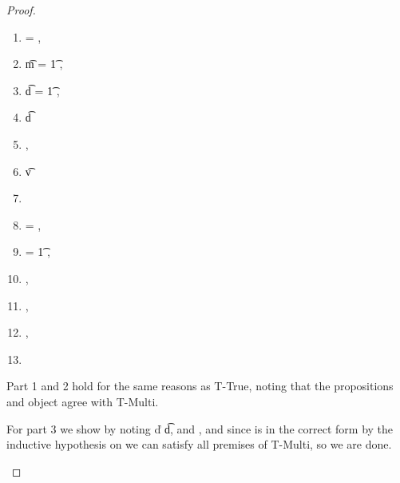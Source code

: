 \begin{lemma}
\begin{proof}
\begin{case}[B-DefMethod]
\begin{itemize}
\begin{subcase}[T-DefMethod]
\begin{enumerate}[resume]
          \item
  \ep{} = { {} {}},
          \item
  \t{m} = {\ArrowOne {\x{}} {\t{1}} {\s{}}
                     {
                                 {}}
                     {}},
          \item
  \t{d} = {\ArrowOne {\x{}} {\t{1}} {\sp{}}
                     {
                                 {}}
                     {}},
          \item
\judgementtworewrite {\propenv{}}
                  {} { {\t{d}}}
                  {}
          \item
  ,
          \item
\judgementtworewrite {\propenv{}}
           {} {\t{v}}
           {}
          \item
           {} {\s{}}
           {
                       {}}
           {}
           {}
          \item
  \e{} = { {} {}},
          \item
   = {\abs {\x{}} {\t{1}} {}},
\item
  ,
\item
  \inpropenv{\topprop{}}{\thenprop{\prop{}}},
\item
  \inpropenv{\botprop{}}{\elseprop{\prop{}}},
\item
  \issubobjin{}{\emptyobject{}}{\object{}}
        \end{enumerate}

                                Part 1 and 2 hold for the same reasons as T-True, noting that the propositions
                                and object agree with T-Multi.

For part 3 we show
by noting \judgementtwo {} {\v{d}} {\t{d}},
  and
  , and since \disptable{} is in the correct form by the inductive
  hypothesis on {} we can satisfy all premises of T-Multi, so we are done.



\end{subcase}
\end{itemize}
\end{case}
\end{proof}
\end{lemma}
